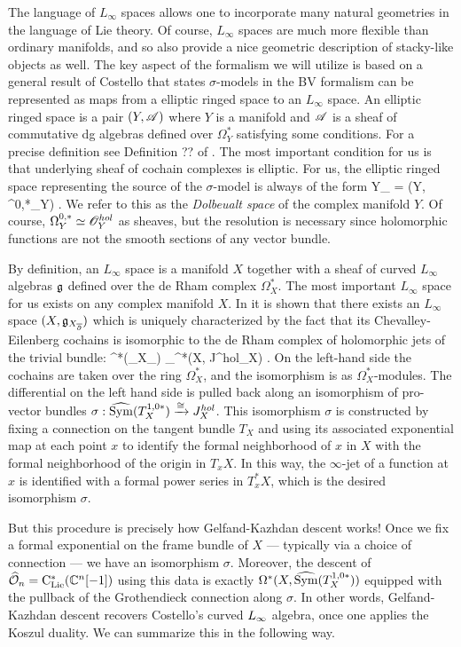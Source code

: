 \documentclass[10pt]{amsart}
\begin{document}
The language of $L_\infty$ spaces allows one to incorporate many natural geometries in the language of Lie theory.
Of course, $L_\infty$ spaces are much more flexible than ordinary manifolds, and so also provide a nice geometric description of stacky-like objects as well.
The key aspect of the formalism we will utilize is based on a general result of Costello \cite{CostelloHolomorphic, WG2} that states $\sigma$-models in the BV formalism can be represented as maps from a elliptic ringed space to an $L_\infty$ space.
An elliptic ringed space is a pair $(Y, \mathscr A)$ where $Y$ is a manifold and $\mathscr A$ is a sheaf of commutative dg algebras defined over $\Omega^*_Y$ satisfying some conditions. 
For a precise definition see Definition ?? of \cite{CostelloHolomorphic}.
The most important condition for us is that underlying sheaf of cochain complexes is elliptic.
For us, the elliptic ringed space representing the source of the $\sigma$-model is always of the form
\ben
Y_{\dbar} = (Y, \Omega^{0,*}_Y) .
\een
We refer to this as the {\em Dolbeualt space} of the complex manifold $Y$. 
Of course, $\Omega^{0,*}_Y \simeq \mathscr O^{hol}_Y$ as sheaves, but the resolution is necessary since holomorphic functions are not the smooth sections of any vector bundle. 

By definition, an $L_\infty$ space is a manifold $X$ together with a sheaf of curved $L_\infty$ algebras $\mathfrak g$ defined over the de Rham complex $\Omega^*_X$. 
The most important $L_\infty$ space for us exists on any complex manifold $X$. 
In \cite{WG2} it is shown that there exists an $L_\infty$ space $(X, \mathfrak g_{X_{\overline{\partial}}})$ which is uniquely characterized by the fact that its Chevalley-Eilenberg cochains is isomorphic to the de Rham complex of holomorphic jets of the trivial bundle:
\ben
\clie^*(\fg_{X_{\dbar}}) \cong_\sigma \Omega^*(X, J^{hol}_X) .
\een
On the left-hand side the cochains are taken over the ring $\Omega^*_X$, and the isomorphism is as $\Omega^*_X$-modules.
The differential on the left hand side is pulled back along an isomorphism of pro-vector bundles 
$\sigma: \widehat{{\rm Sym}}(T^{1,0*}_X) \xrightarrow{\cong} J^{hol}_X$.
This isomorphism $\sigma$ is constructed by fixing a connection on the tangent bundle $T_X$
and using its associated exponential map at each point $x$ 
to identify the formal neighborhood of $x$ in $X$ with the formal neighborhood of the origin in $T_x X$.
In this way, the $\infty$-jet of a function at $x$ is identified with a formal power series in $T_x^* X$,
which is the desired isomorphism $\sigma$.

But this procedure is precisely how Gelfand-Kazhdan descent works! 
Once we fix a formal exponential on the frame bundle of $X$ --- typically via a choice of connection --- we have an isomorphism $\sigma$.
Moreover, the descent of $\widehat{\mathcal O}_n = {\rm C}_{{\rm Lie}}^*(\mathbb C^n[-1])$ using this data is exactly $\Omega^*(X, \widehat{{\rm Sym}}(T^{1,0*}_X))$
equipped with the pullback of the Grothendieck connection along $\sigma$.
In other words, Gelfand-Kazhdan descent recovers Costello's curved $\L8$ algebra,
once one applies the Koszul duality.
We can summarize this in the following way.
\end{document}

